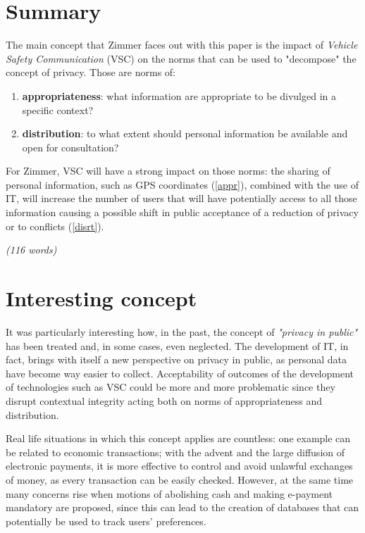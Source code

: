 \section{Summary}
The main concept that Zimmer faces out with this paper is the impact of \textit{Vehicle Safety Communication} (VSC) on the norms that can be used to "decompose" the concept of privacy. Those are norms of:
\begin{enumerate}
\item \textbf{appropriateness}\label{appr}: what information are appropriate to be divulged in a specific context?
\item \textbf{distribution}\label{disrt}: to what extent should personal information be available and open for consultation? 
\end{enumerate}

For Zimmer, VSC will have a strong impact on those norms: the sharing of personal information, such as GPS coordinates (\ref{appr}), combined with the use of IT, will increase the number of users that will have potentially access to all those information causing a possible shift in public acceptance of a reduction of privacy or to conflicts (\ref{disrt}).

\emph{(116 words)}

\section{Interesting concept}
It was particularly interesting how, in the past, the concept of \textit{"privacy in public"} has been treated and, in some cases, even neglected. The development of IT, in fact, brings with itself a new perspective on privacy in public, as personal data have become way easier to collect. Acceptability of outcomes of the development of technologies such as VSC could be more and more problematic since they disrupt contextual integrity acting both on norms of appropriateness and distribution.

Real life situations in which this concept applies are countless: one example can be related to economic transactions; with the advent and the large diffusion of electronic payments, it is more effective to control and avoid unlawful exchanges of money, as every transaction can be easily checked. However, at the same time many concerns rise when motions of abolishing cash and making e-payment mandatory are proposed, since this can lead to the creation of databases that can potentially be used to track users' preferences.

